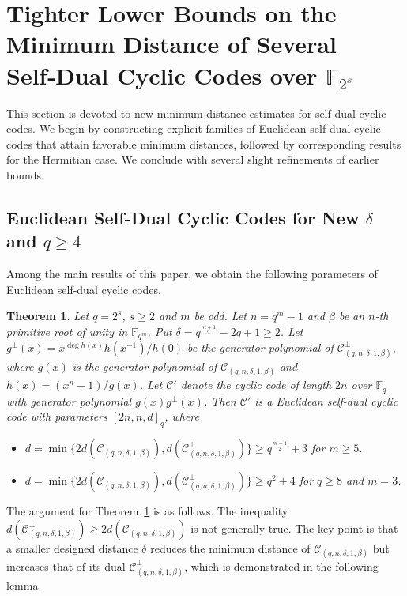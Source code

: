 \documentclass[journal,12pt,onecolumn]{IEEEtran}
\newtheorem{theorem}{Theorem}
\begin{document}
\section{Tighter Lower Bounds on the Minimum Distance of Several Self‑Dual Cyclic Codes over $\mathbb{F}_{2^s}$ }
This section is devoted to new minimum‑distance estimates for self‑dual cyclic codes. We begin by constructing explicit families of Euclidean self‑dual cyclic codes that attain favorable minimum distances, followed by corresponding results for the Hermitian case. We conclude with several slight refinements of earlier bounds.


\label{3}
\subsection{Euclidean Self-Dual Cyclic Codes for New $\delta$ and $q\ge 4$}

Among the main results of this paper, we obtain the following parameters of Euclidean self-dual cyclic codes.

\begin{theorem}
    \label{4 small delta self-dual cyclic}
    Let $q=2^s$, $s\ge2$ and $m$ be odd. Let $n=q^m-1$ and $\beta$ be an $n$-th primitive root of unity in $\mathbb{F}_{q^m}$. Put $\delta=q^{\frac{m+1}{2}}-2q+1\ge2$. Let $g^\perp(x)=x^{\deg h(x)}h(x^{-1})/h(0)$ be the generator polynomial of $\mathcal{C}_{(q,n,\delta,1,\beta)}^\perp$, where $g(x)$ is the generator polynomial of $\mathcal{C}_{(q,n,\delta,1,\beta)}$ and $h(x)=(x^n-1)/g(x)$. Let $\mathcal{C}'$ denote the cyclic code of length $2n$ over $\mathbb{F}_q$ with generator polynomial $g(x)g^\perp(x)$. Then $\mathcal{C}'$ is a Euclidean self-dual cyclic code with parameters $[2n,n,d]_q$, where
    \begin{itemize}
        \item $d=\min\{2d(\mathcal{C}_{(q,n,\delta,1,\beta)}),d(\mathcal{C}_{(q,n,\delta,1,\beta)}^\perp)\}\ge q^\frac{m+1}{2}+3$ for $m\ge5$.
        \item $d=\min\{2d(\mathcal{C}_{(q,n,\delta,1,\beta)}),d(\mathcal{C}_{(q,n,\delta,1,\beta)}^\perp)\}\ge q^2+4$ for $q\ge8$ and $m=3$.
    \end{itemize}
\end{theorem}

The argument for Theorem~\ref{4 small delta self-dual cyclic} is as follows. The inequality
$d(\mathcal{C}^{\perp}_{(q,n,\delta,1,\beta)}) \ge 2d(\mathcal{C}_{(q,n,\delta,1,\beta)})$
is not generally true. The key point is that a smaller designed distance $\delta$ reduces the minimum distance of $\mathcal{C}_{(q,n,\delta,1,\beta)}$ but increases that of its dual $\mathcal{C}^{\perp}_{(q,n,\delta,1,\beta)}$, which is demonstrated in the following lemma.
\end{document}
